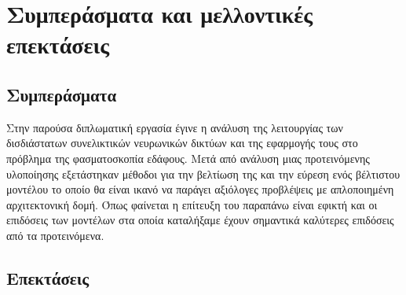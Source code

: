 \chapter{Συμπεράσματα και μελλοντικές επεκτάσεις}
\label{ch:conclusions}
\section{Συμπεράσματα}
Στην παρούσα διπλωματική εργασία έγινε η ανάλυση της λειτουργίας των δισδιάστατων συνελικτικών νευρωνικών δικτύων και της εφαρμογής τους στο πρόβλημα της φασματοσκοπία εδάφους. Μετά από ανάλυση μιας προτεινόμενης υλοποίησης εξετάστηκαν μέθοδοι για την βελτίωση της και την εύρεση ενός βέλτιστου μοντέλου το οποίο θα είναι ικανό να παράγει αξιόλογες προβλέψεις με απλοποιημένη αρχιτεκτονική δομή. Όπως φαίνεται η επίτευξη του παραπάνω είναι εφικτή και οι επιδόσεις των μοντέλων στα οποία καταλήξαμε έχουν σημαντικά καλύτερες επιδόσεις από τα προτεινόμενα.

\section{Επεκτάσεις}
